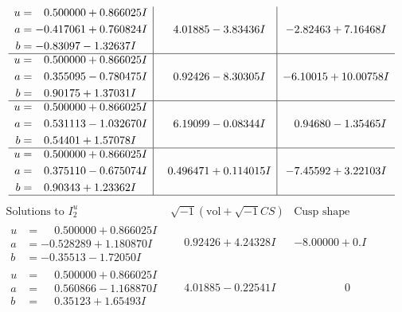 \documentclass[1p]{elsarticle_modified}
\theoremstyle{definition}
\newcommand{\I}{\sqrt{-1}}
\begin{document}
$$\begin{array}{c|c|c}
\begin{aligned}
u &= \phantom{-}0.500000 + 0.866025 I \\
a &= -0.417061 + 0.760824 I \\
b &= -0.83097 - 1.32637 I\end{aligned}
 & \phantom{-}4.01885 - 3.83436 I & -2.82463 + 7.16468 I \\ \hline\begin{aligned}
u &= \phantom{-}0.500000 + 0.866025 I \\
a &= \phantom{-}0.355095 - 0.780475 I \\
b &= \phantom{-}0.90175 + 1.37031 I\end{aligned}
 & \phantom{-}0.92426 - 8.30305 I & -6.10015 + 10.00758 I \\ \hline\begin{aligned}
u &= \phantom{-}0.500000 + 0.866025 I \\
a &= \phantom{-}0.531113 - 1.032670 I \\
b &= \phantom{-}0.54401 + 1.57078 I\end{aligned}
 & \phantom{-}6.19099 - 0.08344 I & \phantom{-}0.94680 - 1.35465 I \\ \hline\begin{aligned}
u &= \phantom{-}0.500000 + 0.866025 I \\
a &= \phantom{-}0.375110 - 0.675074 I \\
b &= \phantom{-}0.90343 + 1.23362 I\end{aligned}
 & \phantom{-}0.496471 + 0.114015 I & -7.45592 + 3.22103 I\\
 \hline 
 \end{array}$$\newpage$$\begin{array}{c|c|c}  
\text{Solutions to }I^u_{2}& \I (\text{vol} + \sqrt{-1}CS) & \text{Cusp shape}\\
 \hline 
\begin{aligned}
u &= \phantom{-}0.500000 + 0.866025 I \\
a &= -0.528289 + 1.180870 I \\
b &= -0.35513 - 1.72050 I\end{aligned}
 & \phantom{-}0.92426 + 4.24328 I & -8.00000 + 0. I\phantom{ +0.000000I} \\ \hline\begin{aligned}
u &= \phantom{-}0.500000 + 0.866025 I \\
a &= \phantom{-}0.560866 - 1.168870 I \\
b &= \phantom{-}0.35123 + 1.65493 I\end{aligned}
 & \phantom{-}4.01885 - 0.22541 I & \phantom{-0.000000 } 0 \\ \hline\begin{aligned}

\end{aligned}
\end{array}$$
\end{document}
